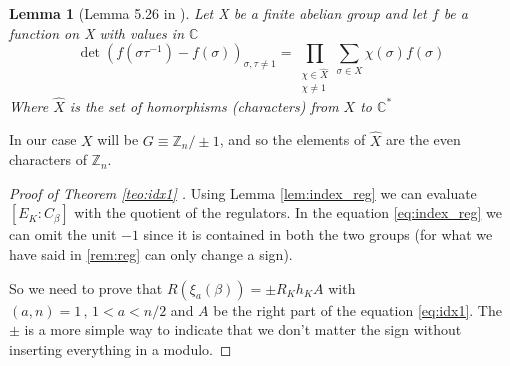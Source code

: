 \documentclass[]{article}
\theoremstyle{plain}
\newtheorem{lem}[teo]{Lemma}
\theoremstyle{remark}
\theoremstyle{definition}
\newcommand{\Z}{\mathbb{Z}}
\newcommand{\C}{\mathbb{C}}
\begin{document}
	\begin{lem}[Lemma 5.26 in \cite{CF}] 
		\label{lem:det}
		Let \textit{X} be a finite abelian group and let $ f $ be a function on \textit{X} with values in $ \C $
		\begin{equation}\label{eq:det}
			\det (f (\sigma \tau ^{-1}) - f (\sigma))_{\sigma , \tau \neq 1 } = \prod_{\substack{\chi \in \hat{X} \\ \chi \neq 1}}  \sum_{\sigma \in X} \chi(\sigma)f(\sigma)
		\end{equation}
		Where $ \hat{X} $ is the set of homorphisms (characters) from $ X $ to $ \C ^\ast $
	\end{lem}
	In our case $ X $  will be $ G \equiv \Z_n / \pm 1 $, and so the elements of $ \hat{X} $ are the even characters of $ \Z_n $. 
	
	\begin{proof}[Proof of Theorem \ref{teo:idx1} ]
			Using Lemma \ref{lem:index_reg} we can evaluate $ [E_K : C_\beta ] $ with the quotient of the regulators. In the equation \ref{eq:index_reg} we can omit the unit $ -1 $ since it is contained in both the two groups (for what we have said in \ref{rem:reg} can only change a sign). 
			
			So we need to prove that $ R(\xi_a(\beta)) = \pm R_K h_K A $ with $ (a,n)=1 \, , \,1 < a <n/2 $ and $ A$ be the right part of the equation \ref{eq:idx1}. The $\pm$ is a more simple way to indicate that we don't matter the sign without inserting everything in a modulo. 
			

\end{proof}
\end{document}

